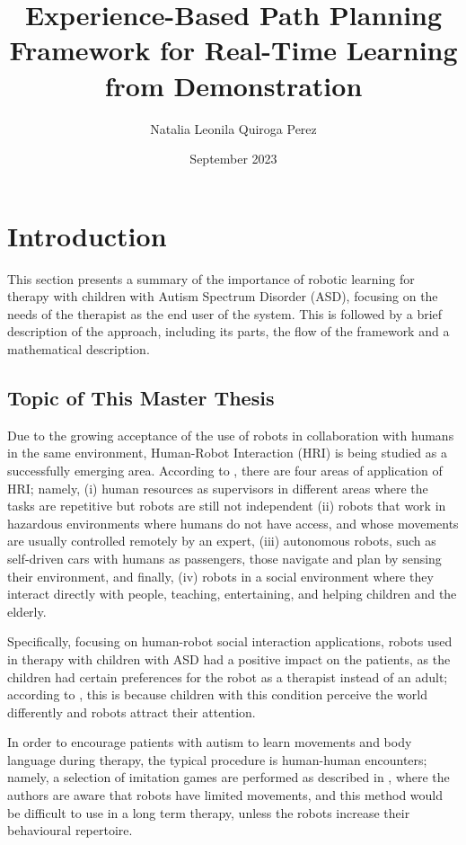 \documentclass[thesis]{mas_proposal}
\title{Experience-Based Path Planning Framework for Real-Time Learning from Demonstration}
\author{Natalia Leonila Quiroga Perez}
\date{September 2023}
\begin{document}
\maketitle

\pagestyle{plain}

\section{Introduction}

	This section presents a summary of the importance of robotic learning for therapy with children with Autism Spectrum Disorder (ASD), focusing on the needs of the therapist as the end user of the system. This is followed by a brief description of the approach, including its parts, the flow of the framework and a mathematical description.
	
	\subsection{Topic of This Master Thesis}

    Due to the growing acceptance of the use of robots in collaboration with humans in the same environment, Human-Robot Interaction (HRI) is being studied as a successfully emerging area. According to \cite{Sheridan2016}, there are four areas of application of HRI; namely, (i) human resources as supervisors in different areas where the tasks are repetitive but robots are still not independent (ii) robots that work in hazardous environments where humans do not have access, and whose movements are usually controlled remotely by an expert, (iii) autonomous robots, such as self-driven cars with humans as passengers, those navigate and plan by sensing their environment, and finally, (iv) robots in a social environment where they interact directly with people, teaching, entertaining, and helping children and the elderly.
    
    Specifically, focusing on human-robot social interaction applications, robots used in therapy with children with ASD had a positive impact on the patients, as the children had certain preferences for the robot as a therapist instead of an adult; according to \cite{Prabha2019}, this is because children with this condition perceive the world differently and robots attract their attention.
    
    In order to encourage patients with autism to learn movements and body language during therapy, the typical procedure is human-human encounters; namely, a selection of imitation games are performed as described in \cite{Dautenhahn2004}, where the authors are aware that robots have limited movements, and this method would be difficult to use in a long term therapy, unless the robots increase their behavioural repertoire.
    
\end{document}
